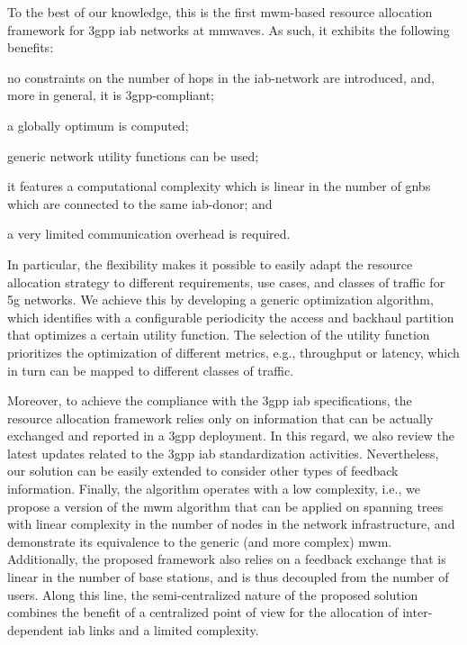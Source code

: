 To the best of our knowledge, this is the first \gls{mwm}-based resource allocation framework for \gls{3gpp} \gls{iab} networks at \glspl{mmwave}. As such, it exhibits the following benefits:
\begin{enumerate*}[label=(\roman*)]
  \item no constraints on the number of hops in the \gls{iab}-network are introduced, and, more in general, it is \gls{3gpp}-compliant;
  \item a globally optimum is computed;
  \item generic network utility functions can be used;
  \item it features a computational complexity which is linear in the number of \glspl{gnb} which are connected to the same \gls{iab}-donor; and 
  \item a very limited communication overhead is required.
\end{enumerate*}

In particular, the flexibility makes it possible to easily adapt the resource allocation strategy to different requirements, use cases, and classes of traffic for \gls{5g} networks. We achieve this by developing a generic optimization algorithm, which identifies with a configurable periodicity the access and backhaul partition that optimizes a certain utility function. The selection of the utility function prioritizes the optimization of different metrics, e.g., throughput or latency, which in turn can be mapped to different classes of traffic.

Moreover, to achieve the compliance with the \gls{3gpp} \gls{iab} specifications, the resource allocation framework relies only on information that can be actually exchanged and reported in a \gls{3gpp} deployment. In this regard, we also review the latest updates related to the \gls{3gpp} \gls{iab} standardization activities. Nevertheless, our solution can be easily extended to consider other types of feedback information.
Finally, the algorithm operates with a low complexity, i.e., we propose a version of the \gls{mwm} algorithm that can be applied on spanning trees with linear complexity in the number of nodes in the network infrastructure, and demonstrate its equivalence to the generic (and more complex) \gls{mwm}. Additionally, the proposed framework also relies on a feedback exchange that is linear in the number of base stations, and is thus decoupled from the number of users. Along this line, the semi-centralized nature of the proposed solution combines the benefit of a centralized point of view for the allocation of inter-dependent \gls{iab} links and a limited complexity.

